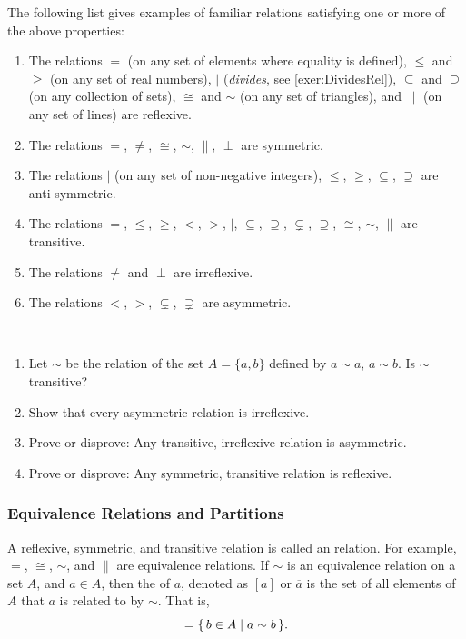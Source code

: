 \begin{Example}
The following list gives examples of familiar relations satisfying one or more of the above properties:
\begin{enumerate}
\item The relations $=$ (on any set of elements where equality is defined), $\le$ and $\ge$ (on any set of real numbers), $\mid$ (\emph{divides}, see \cref{exer:DividesRel}), $\subseteq$ and $\supseteq$ (on any collection of sets), $\cong$ and $\sim$ (on any set of triangles), and $\parallel$ (on any set of lines) are reflexive.
\item The relations $=$, $\ne$, $\cong$, $\sim$, $\parallel$, $\perp$ are symmetric.
\item The relations $\mid$ (on any set of non-negative integers), $\le$, $\ge$, $\subseteq$, $\supseteq$ are anti-symmetric.
\item The relations $=$, $\le$, $\ge$, $<$, $>$, $\mid$, $\subseteq$, $\supseteq$, $\subsetneq$, $\supseteq$, $\cong$, $\sim$, $\parallel$ are transitive.
\item The relations $\ne$ and $\perp$ are irreflexive.
\item The relations $<$, $>$, $\subsetneq$, $\supsetneq$ are asymmetric.
\end{enumerate}
\end{Example}

\begin{Exercise}~
\begin{enumerate}
\item Let $\sim$ be the relation of the set $A = \{a, b\}$ defined by $a \sim a$, $a \sim b$. Is $\sim$ transitive?
\item Show that every asymmetric relation is irreflexive.
\item Prove or disprove: Any transitive, irreflexive relation is asymmetric.
\item Prove or disprove: Any symmetric, transitive relation is reflexive.
\end{enumerate}
\end{Exercise}

\subsubsection{Equivalence Relations and Partitions}

A reflexive, symmetric, and transitive relation is called an  relation. For example, $=$, $\cong$, $\sim$, and $\parallel$ are equivalence relations. If $\sim$ is an equivalence relation on a set $A$, and $a \in A$, then the  of $a$, denoted as $[a]$ or $\overline a$ is the set of all elements of $A$ that $a$ is related to by $\sim$. That is,
\begin{equation*}
[a] = \qty{\, b \in A \mid a \sim b \,}.
\end{equation*}

